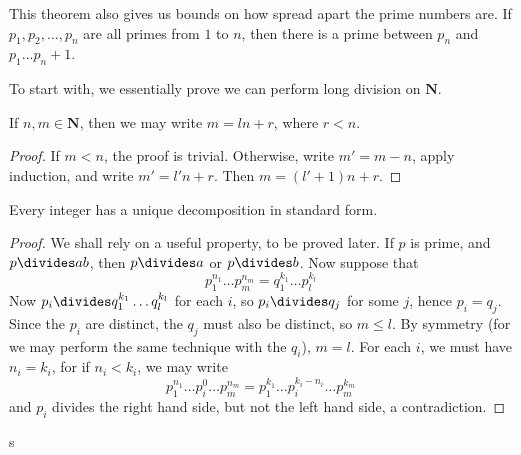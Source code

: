 This theorem also gives us bounds on how spread apart the prime numbers are. If $p_1, p_2, \dots, p_n$ are all primes from $1$ to $n$, then there is a prime between $p_n$ and $p_1 \dots p_n + 1$.

To start with, we essentially prove we can perform long division on $\mathbf{N}$.

\begin{lemma}
    If $n,m \in \mathbf{N}$, then we may write $m = ln + r$, where $r < n$.
\end{lemma}
\begin{proof}
    If $m < n$, the proof is trivial. Otherwise, write $m' = m - n$, apply induction, and write $m' = l'n + r$. Then $m = (l' + 1)n + r$.
\end{proof}

\begin{theorem}
    Every integer has a unique decomposition in standard form.
\end{theorem}
\begin{proof}
    We shall rely on a useful property, to be proved later. If $p$ is prime, and $p \divides ab$, then $p \divides a$ or $p \divides b$. Now suppose that
    \[ p_1^{n_1} \dots p_m^{n_m} = q_1^{k_1} \dots p_l^{k_l} \]
    Now $p_i \divides q_1^{k_1} \dots q_l^{k_l}$ for each $i$, so $p_i \divides q_j$ for some $j$, hence $p_i = q_j$. Since the $p_i$ are distinct, the $q_j$ must also be distinct, so $m \leq l$. By symmetry (for we may perform the same technique with the $q_i$), $m = l$. For each $i$, we must have $n_i = k_i$, for if $n_i < k_i$, we may write
    \[ p_1^{n_1} \dots p_i^0 \dots p_m^{n_m} = p_1^{k_1} \dots p_i^{k_i - n_i} \dots p_m^{k_m} \]
    and $p_i$ divides the right hand side, but not the left hand side, a contradiction.
\end{proof}

s

